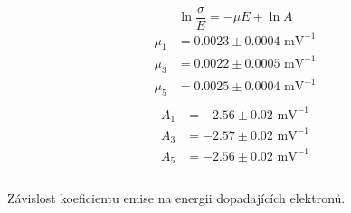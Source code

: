 \documentclass[a4paper,11pt]{article}
\begin{document}
\begin{table}[htpb]
    \begin{minipage}[b]{.35\linewidth}
        \centering
        \begin{equation}
            \ln \frac{\sigma}{E} = -\mu E + \ln A
        \end{equation}
        \begin{align*}
            \mu_1 &= 0.0023 \pm 0.0004 \text{ mV}^{-1} \\
            \mu_3 &= 0.0022  \pm 0.0005 \text{ mV}^{-1} \\
            \mu_5 &= 0.0025 \pm 0.0004 \text{ mV}^{-1}\\
        \end{align*}
        \vspace{-30pt}
        \begin{align*}
            A_1 &= -2.56 \pm 0.02 \text{ mV}^{-1}\\
            A_3 &= -2.57 \pm 0.02 \text{ mV}^{-1}\\
            A_5 &= -2.56 \pm 0.02 \text{ mV}^{-1}\\
            \\
        \end{align*}
    \end{minipage} 
    \hfill
    \begin{minipage}[b]{.60\linewidth}
        \centering
        
        \captionsetup{type=graph}
        \caption{Závislost koeficientu emise na energii dopadajících elektronů.}
    \end{minipage} 
\end{table}

\vspace{-10pt}
\end{document}
